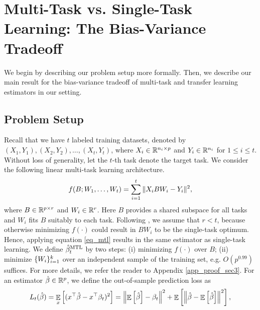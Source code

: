 \section{Multi-Task vs. Single-Task Learning: The Bias-Variance Tradeoff}
\label{sec_main}

We begin by describing our problem setup more formally.
Then, we describe our main result for the bias-variance tradeoff of multi-task and transfer learning estimators in our setting.

\subsection{Problem Setup}\label{sec_setup}

Recall that we have $t$ labeled training datasets, denoted by $(X_1, Y_1), (X_2, Y_2), \dots, (X_t, Y_t)$, where $X_i\in\mathbb{R}^{n_i\times p}$ and $Y_i\in\mathbb{R}^{n_i}$ for $1\le i\le t$.
Without loss of generality, let the $t$-th task denote the target task.
We consider the following linear multi-task learning architecture.
\begin{align}
	\label{eq_mtl}
	f(B; W_1, \dots, W_t) = \sum_{i=1}^t \|X_i B W_i - Y_i\|^2,
\end{align}
where $B\in\mathbb{R}^{p\times r}$ and $W_i\in\mathbb{R}^r$.
Here $B$ provides a shared subspace for all tasks and $W_i$ fits $B$ suitably to each task.
Following \cite{WZR20}, we assume that $r < t$, because otherwise minimizing $f(\cdot)$ could result in $BW_i$ to be the single-task optimum.
Hence, applying equation \eqref{eq_mtl} results in the same estimator as single-task learning.
We define $\hat{\beta}_t^{\text{MTL}}$ by two steps:
(i) minimizing $f(\cdot)$ over $B$;
(ii) minimize $\{W_i\}_{i=1}^k$ over an independent sample of the training set, e.g. $O(p^{0.99})$ suffices.
For more details, we refer the reader to Appendix \ref{app_proof_sec3}.
For an estimator $\hat{\beta}\in\mathbb{R}^p$, we define the out-of-sample prediction loss as
	\begin{align*}
		L_t(\hat{\beta}) = \mathop{\mathbb{E}}_{x}\left[ ({x}^{\top}\hat{\beta} - {x}^{\top}\beta_t)^2 \right]
		= \left\| \mathop{\mathbb{E}}\left[ \hat{\beta} \right] - \beta_t \right\|^2 + \mathop{\mathbb{E}}\left[ \left\| \hat{\beta} - \mathop{\mathbb{E}}\left[ \hat{\beta} \right] \right\|^2 \right],
	\end{align*}
